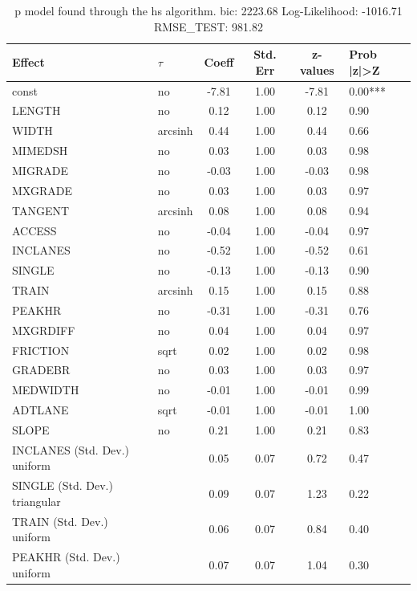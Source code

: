\begin{table}
	\caption{p model found through the hs algorithm. bic: 2223.68 Log-Likelihood: -1016.71 RMSE_TEST: 981.82}
	\begin{center}
		\begin{tabular}{|l|l|c|c|c|l|}
			\hline
			Effect & $\tau$ & Coeff & Std. Err & z-values & Prob |z|>Z \\
			\hline
			const & no & -7.81 & 1.00 & -7.81 & 0.00*** \\
			\hline
			LENGTH & no & 0.12 & 1.00 & 0.12 & 0.90 \\
			\hline
			WIDTH & arcsinh & 0.44 & 1.00 & 0.44 & 0.66 \\
			\hline
			MIMEDSH & no & 0.03 & 1.00 & 0.03 & 0.98 \\
			\hline
			MIGRADE & no & -0.03 & 1.00 & -0.03 & 0.98 \\
			\hline
			MXGRADE & no & 0.03 & 1.00 & 0.03 & 0.97 \\
			\hline
			TANGENT & arcsinh & 0.08 & 1.00 & 0.08 & 0.94 \\
			\hline
			ACCESS & no & -0.04 & 1.00 & -0.04 & 0.97 \\
			\hline
			INCLANES & no & -0.52 & 1.00 & -0.52 & 0.61 \\
			\hline
			SINGLE & no & -0.13 & 1.00 & -0.13 & 0.90 \\
			\hline
			TRAIN & arcsinh & 0.15 & 1.00 & 0.15 & 0.88 \\
			\hline
			PEAKHR & no & -0.31 & 1.00 & -0.31 & 0.76 \\
			\hline
			MXGRDIFF & no & 0.04 & 1.00 & 0.04 & 0.97 \\
			\hline
			FRICTION & sqrt & 0.02 & 1.00 & 0.02 & 0.98 \\
			\hline
			GRADEBR & no & 0.03 & 1.00 & 0.03 & 0.97 \\
			\hline
			MEDWIDTH & no & -0.01 & 1.00 & -0.01 & 0.99 \\
			\hline
			ADTLANE & sqrt & -0.01 & 1.00 & -0.01 & 1.00 \\
			\hline
			SLOPE & no & 0.21 & 1.00 & 0.21 & 0.83 \\
			\hline
			INCLANES (Std. Dev.) uniform &  & 0.05 & 0.07 & 0.72 & 0.47 \\
			\hline
			SINGLE (Std. Dev.) triangular &  & 0.09 & 0.07 & 1.23 & 0.22 \\
			\hline
			TRAIN (Std. Dev.) uniform &  & 0.06 & 0.07 & 0.84 & 0.40 \\
			\hline
			PEAKHR (Std. Dev.) uniform &  & 0.07 & 0.07 & 1.04 & 0.30 \\

\end{tabular}
\end{center}
\end{table}
